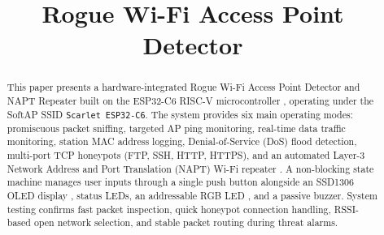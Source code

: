 \documentclass[conference]{IEEEtran}
\begin{document}
\title{Rogue Wi-Fi Access Point Detector}

\author{
\and
{}
\and
{}
\and
{}
\and
{}
}

\maketitle

\begin{abstract}
This paper presents a hardware-integrated Rogue Wi-Fi Access Point Detector and NAPT Repeater built on the ESP32-C6 RISC-V microcontroller \cite{esp32c6}, operating under the SoftAP SSID \texttt{Scarlet ESP32-C6}. The system provides six main operating modes: promiscuous packet sniffing, targeted AP ping monitoring, real-time data traffic monitoring, station MAC address logging, Denial-of-Service (DoS) flood detection, multi-port TCP honeypots (FTP, SSH, HTTP, HTTPS), and an automated Layer-3 Network Address and Port Translation (NAPT) Wi-Fi repeater \cite{napt_ref}. A non-blocking state machine manages user inputs through a single push button alongside an SSD1306 OLED display \cite{ssd1306}, status LEDs, an addressable RGB LED \cite{neopixel}, and a passive buzzer. System testing confirms fast packet inspection, quick honeypot connection handling, RSSI-based open network selection, and stable packet routing during threat alarms.
\end{abstract}
\end{document}
